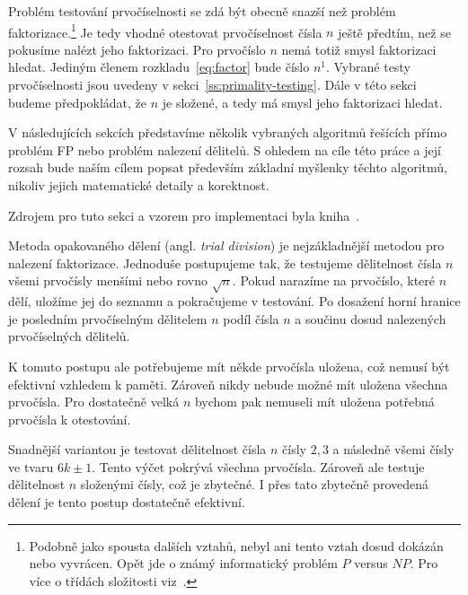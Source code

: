 \documentclass[
  program=infoi,
  biblatex=false,
  figures=true,
  glossaries,
  tables=false,
  sourcecodes=true,
  index
]{kidiplom}
\begin{document}
        Problém testování prvočíselnosti se zdá být obecně snazší než problém faktorizace.\footnote{Podobně
        jako spousta dalších vztahů, nebyl ani tento vztah dosud dokázán nebo vyvrácen.
        Opět jde o známý informatický problém $P$ versus $NP$. Pro více o třídách složitosti viz~\cite{complexity}.}
        Je tedy vhodné otestovat prvočíselnost čísla $n$ ještě předtím, než se pokusíme nalézt jeho faktorizaci.
        Pro prvočíslo $n$ nemá totiž smysl faktorizaci hledat.
        Jediným členem rozkladu~\ref{eq:factor} bude číslo $n^1$.
        Vybrané testy prvočíselnosti jsou uvedeny v sekci~\ref{ss:primality-testing}.
        Dále v této sekci budeme předpokládat, že $n$ je složené, a tedy má smysl jeho faktorizaci hledat.
        
        V následujících sekcích představíme několik vybraných algoritmů řešících přímo problém FP
        nebo problém nalezení dělitelů.
        S ohledem na cíle této práce a její rozsah bude naším cílem popsat především základní myšlenky těchto algoritmů, nikoliv
        jejich matematické detaily a korektnost.


        \label{sss:trial-division-factorization}

            Zdrojem pro tuto sekci a vzorem pro implementaci byla kniha~\cite{primes-and-factorization}.

            Metoda opakovaného dělení (angl. \emph{trial division}) je nejzákladnější metodou pro nalezení faktorizace.
            Jednoduše postupujeme tak, že testujeme dělitelnost čísla $n$ všemi prvočísly menšími nebo rovno $\sqrt{n}$.
            Pokud narazíme na prvočíslo, které $n$ dělí, uložíme jej do seznamu a pokračujeme v testování.
            Po dosažení horní hranice je posledním prvočíselným dělitelem $n$ podíl čísla $n$ a
            součinu dosud nalezených prvočíselných dělitelů.

            K tomuto postupu ale potřebujeme mít někde prvočísla uložena, což nemusí být efektivní vzhledem k paměti.
            Zároveň nikdy nebude možné mít uložena všechna prvočísla.
            Pro dostatečně velká $n$ bychom pak nemuseli mít uložena potřebná prvočísla k otestování.

            Snadnější variantou je testovat dělitelnost čísla $n$ čísly $2,3$ a následně všemi čísly ve tvaru $6k \pm 1$.
            Tento výčet pokrývá všechna prvočísla.
            Zároveň ale testuje dělitelnost $n$ složenými čísly, což je zbytečné.
            I přes tato zbytečně provedená dělení je tento postup dostatečně efektivní.
\end{document}
